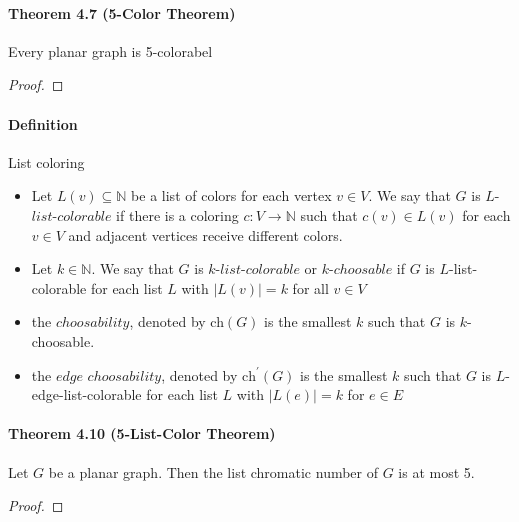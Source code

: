 \paragraph{Theorem 4.7 (5-Color Theorem)} Every planar graph is 5-colorabel
\begin{proof}
     {\color{red}{TODO}}   
\end{proof}

\paragraph{Definition} List coloring
\begin{itemize}
    \item Let $L(v) \subseteq \mathbb{N}$ be a list of colors for each vertex 
    $v \in V$. We say that $ G $ is $L$-$list$-$colorable$ if there is a coloring
    $c: V \to \mathbb{N}$ such that $c(v) \in L(v)$ for each $v \in V$ and 
    adjacent vertices receive different colors. 
    \item Let $k \in \mathbb{N}$. We say that $G$ is $k$-$list$-$colorable$ or 
    $k$-$choosable$ if $G$ is $L$-list-colorable for each list $L$ with 
    $|L(v)| = k$ for all $v \in V$
    \item the $choosability$, denoted by ch$(G)$ is the smallest $k$ such that
    $G$ is $k$-choosable.
    \item the $edge$ $choosability$, denoted by $\text{ch}^\prime(G)$ is the 
    smallest $k$ such that $G$ is $L$-edge-list-colorable for each list
    $L$ with $|L(e)| = k$ for $e \in E$
\end{itemize}

\paragraph{Theorem 4.10 (5-List-Color Theorem)} Let $ G $ be a planar graph.
Then the list chromatic number of $ G $ is at most 5.
\begin{proof}
    {\color{red}{TODO}}
\end{proof}